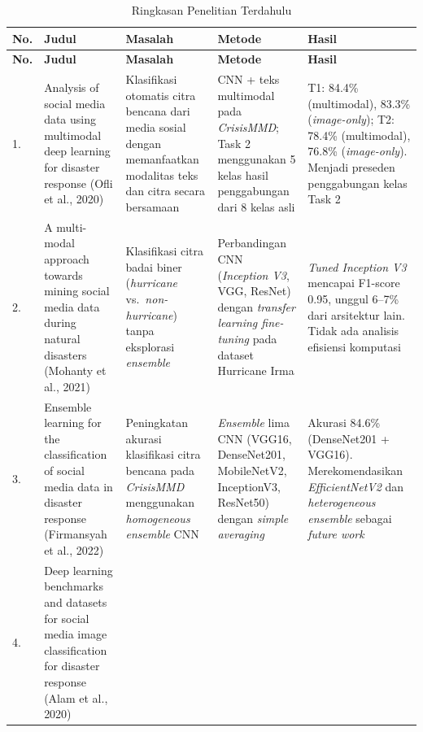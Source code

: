 \begin{longtable}{|b{}|p{}|p{}
|p{}|p{}|}
    \caption{Ringkasan Penelitian Terdahulu}
    \label{table:2.literasi}\\
    \hline
    \textbf{No.} & \textbf{Judul} & \textbf{Masalah} &
    \textbf{Metode} & \textbf{Hasil} \\
    \hline
    \endfirsthead
    \hline
    \textbf{No.} & \textbf{Judul} & \textbf{Masalah} &
    \textbf{Metode} & \textbf{Hasil} \\
    \hline
    \endhead
    1. &
    Analysis of social media data using multimodal deep learning for
    disaster response (Ofli et al., 2020) \cite{ofli2020analysis} &
    Klasifikasi otomatis citra bencana dari media sosial dengan
    memanfaatkan modalitas teks dan citra secara bersamaan &
    CNN + teks multimodal pada \textit{CrisisMMD}; Task 2 menggunakan
    5 kelas hasil penggabungan dari 8 kelas asli &
    T1: 84.4\% (multimodal), 83.3\% (\textit{image-only}); T2: 78.4\%
    (multimodal), 76.8\% (\textit{image-only}). Menjadi preseden
    penggabungan kelas Task 2 \\
    \hline
    2. &
    A multi-modal approach towards mining social media data during
    natural disasters (Mohanty et al., 2021) \cite{mohanty2021multimodal} &
    Klasifikasi citra badai biner (\textit{hurricane} vs.\
    \textit{non-hurricane}) tanpa eksplorasi \textit{ensemble} &
    Perbandingan CNN (\textit{Inception V3}, VGG, ResNet) dengan
    \textit{transfer learning fine-tuning} pada dataset Hurricane Irma &
    \textit{Tuned Inception V3} mencapai F1-score 0.95, unggul 6--7\%
    dari arsitektur lain. Tidak ada analisis efisiensi komputasi \\
    \hline
    3. &
    Ensemble learning for the classification of social media data in
    disaster response (Firmansyah et al., 2022)
    \cite{firmansyah2022ensemble} &
    Peningkatan akurasi klasifikasi citra bencana pada
    \textit{CrisisMMD} menggunakan \textit{homogeneous ensemble} CNN &
    \textit{Ensemble} lima CNN (VGG16, DenseNet201, MobileNetV2,
    InceptionV3, ResNet50) dengan \textit{simple averaging} &
    Akurasi 84.6\% (DenseNet201 + VGG16). Merekomendasikan
    \textit{EfficientNetV2} dan \textit{heterogeneous ensemble}
    sebagai \textit{future work} \\
    \hline
    4. &
    Deep learning benchmarks and datasets for social media image
    classification for disaster response (Alam et al., 2020)
    \cite{ofli2020benchmarks} &

\end{longtable}
